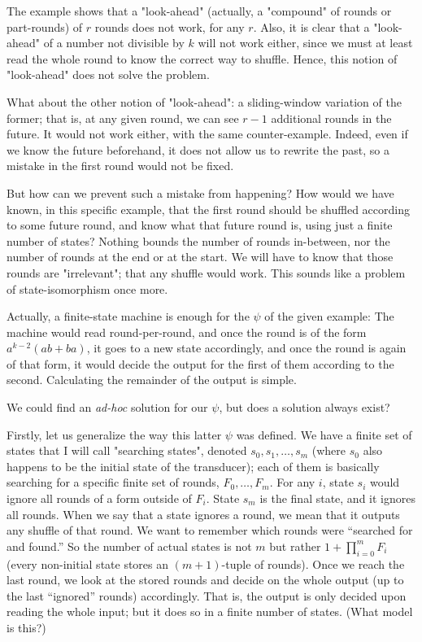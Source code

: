 The example shows that a "look-ahead" (actually, a "compound" of rounds or part-rounds) of $r$ rounds does not work, for any $r$. Also, it is clear that a "look-ahead" of a number not divisible by $k$ will not work either, since we must at least read the whole round to know the correct way to shuffle. Hence, this notion of "look-ahead" does not solve the problem.

What about the other notion of "look-ahead": a sliding-window variation of the former; that is, at any given round, we can see $r-1$ additional rounds in the future. It would not work either, with the same counter-example. Indeed, even if we know the future beforehand, it does not allow us to rewrite the past, so a mistake in the first round would not be fixed.

But how can we prevent such a mistake from happening? How would we have known, in this specific example, that the first round should be shuffled according to some future round, and know what that future round is, using just a finite number of states? Nothing bounds the number of rounds in-between, nor the number of rounds at the end or at the start. We will have to know that those rounds are "irrelevant"; that any shuffle would work. This sounds like a problem of state-isomorphism once more.

Actually, a finite-state machine is enough for the $\psi$ of the given example: The machine would read round-per-round, and once the round is of the form $a^{k-2}(ab+ba)$, it goes to a new state accordingly, and once the round is again of that form, it would decide the output for the first of them according to the second. Calculating the remainder of the output is simple.

We could find an \emph{ad-hoc} solution for our $\psi$, but does a solution always exist?

Firstly, let us generalize the way this latter $\psi$ was defined. We have a finite set of states that I will call "searching states", denoted $s_0, s_1, \dots, s_m$ (where $s_0$ also happens to be the initial state of the transducer); each of them is basically searching for a specific finite set of rounds, $F_0, \dots, F_m$. For any $i$, state $s_i$ would ignore all rounds of a form outside of $F_i$. State $s_m$ is the final state, and it ignores all rounds. When we say that a state ignores a round, we mean that it outputs any shuffle of that round. We want to remember which rounds were ``searched for and found.'' So the number of actual states is not $m$ but rather $1+\prod_{i=0}^m F_i$ (every non-initial state stores an $(m+1)$-tuple of rounds). Once we reach the last round, we look at the stored rounds and decide on the whole output (up to the last ``ignored'' rounds) accordingly. That is, the output is only decided upon reading the whole input; but it does so in a finite number of states. (What model is this?)


